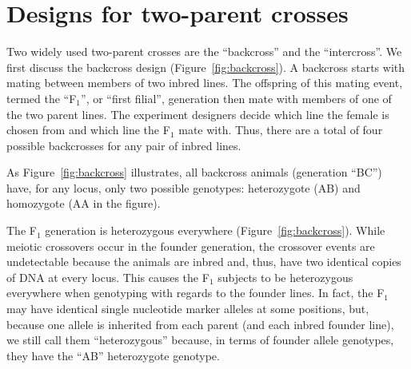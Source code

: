 \documentclass[oneside]{book}\usepackage[]{graphicx}\usepackage[]{color}
\begin{document}




































\section{Designs for two-parent crosses}

Two widely used two-parent crosses are the ``backcross'' and the ``intercross''. We first discuss the backcross design (Figure~\ref{fig:backcross}). A backcross starts with mating between members of two inbred lines. The offspring of this mating event, termed the ``F$_1$'', or ``first filial'', generation then mate with members of one of the two parent lines. The experiment designers decide which line the female is chosen from and which line the F$_1$ mate with. Thus, there are a total of four possible backcrosses for any pair of inbred lines. 

As Figure~\ref{fig:backcross} illustrates, all backcross animals (generation ``BC'') have, for any locus, only two possible genotypes: heterozygote (AB) and homozygote (AA in the figure). 

The F$_1$ generation is heterozygous everywhere (Figure~\ref{fig:backcross}).
While meiotic crossovers occur in the founder generation, the crossover events are
undetectable because the animals are inbred and, thus, have two identical copies
of DNA at every locus. This causes the F$_1$ subjects to be heterozygous everywhere
when genotyping with regards to the founder lines.
In fact, the F$_1$ may have identical single nucleotide marker alleles at some
positions, but, because one allele is inherited from each parent (and each inbred
founder line), we still call them ``heterozygous'' because, in terms of founder allele genotypes, they have the ``AB'' heterozygote genotype.
\end{document}
